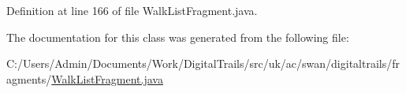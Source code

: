 Definition at line 166 of file Walk\+List\+Fragment.\+java.



The documentation for this class was generated from the following file\+:\begin{DoxyCompactItemize}
\item 
C\+:/\+Users/\+Admin/\+Documents/\+Work/\+Digital\+Trails/src/uk/ac/swan/digitaltrails/fragments/\hyperlink{_walk_list_fragment_8java}{Walk\+List\+Fragment.\+java}\end{DoxyCompactItemize}

